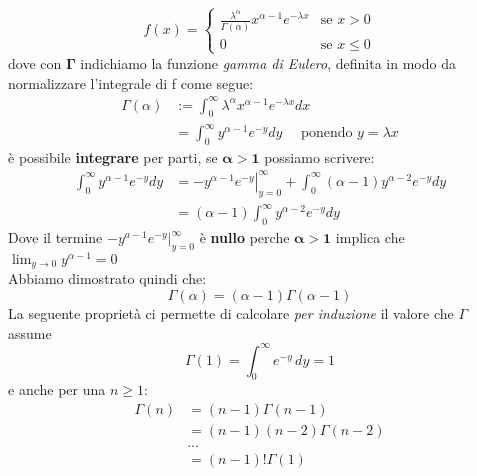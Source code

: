 \documentclass[]{article}
\begin{document}
    \begin{equation*}
        f(x) =
        \begin{cases}
            \frac{\lambda^\alpha}{\Gamma(\alpha)} x^{\alpha - 1} e^{-\lambda x} & \text{se } x > 0 \\
            0 & \text{se } x \leq 0 
        \end{cases}
    \end{equation*}
    dove con $\boldsymbol{\Gamma}$ indichiamo la funzione \textit{gamma di Eulero}, definita in modo da normalizzare l'integrale di f come segue:
    \begin{equation}
        \begin{aligned}
            \Gamma(\alpha) & :=\int_0^{\infty} \lambda^\alpha x^{\alpha-1} e^{-\lambda x} d x \\
            & =\int_0^{\infty} y^{\alpha-1} e^{-y} d y \quad \text { ponendo } y=\lambda x
        \end{aligned}
    \end{equation}
    è possibile \textbf{integrare} per parti, se $\boldsymbol{\alpha > 1}$ possiamo scrivere:
    \begin{equation}
        \begin{aligned}
            \int_0^{\infty} y^{\alpha-1} e^{-y} d y & =-\left.y^{\alpha-1} e^{-y}\right|_{y=0} ^{\infty}+\int_0^{\infty}(\alpha-1) y^{\alpha-2} e^{-y} d y \\
            & =(\alpha-1) \int_0^{\infty} y^{\alpha-2} e^{-y} d y
        \end{aligned}
    \end{equation}
    Dove il termine $-y^{a-1} e^{-y} \bigg\rvert_{y = 0}^{\infty}$ è \textbf{nullo} perche $\boldsymbol{\alpha > 1}$ implica che $\lim_{y \to 0} y^{\alpha - 1} = 0$ \\
    Abbiamo dimostrato quindi che:
    \[ \Gamma (\alpha) = (\alpha - 1) \Gamma(\alpha - 1) \]
    La seguente proprietà ci permette di calcolare \textit{per induzione} il valore che $\Gamma$ assume
    \[ \Gamma(1) = \int_{0}^{\infty} e^{-y} \, dy = 1 \]
    e anche per una $n \geq 1$:
    \begin{equation*}
        \begin{split}
            \Gamma(n) &= (n - 1) \Gamma(n-1) \\
            &= (n-1) (n-2)\Gamma(n-2) \\
            & ... \\
            &= (n-1)! \Gamma(1)
        \end{split}
    \end{equation*}
\end{document}
